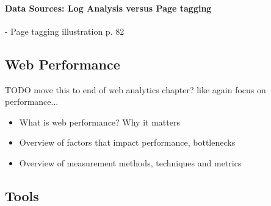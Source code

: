 



\paragraph{Data Sources: Log Analysis versus Page tagging}


- Page tagging illustration p. 82





















\subsection{Web Performance}
TODO move this to end of web analytics chapter? like again focus on performance...
\begin{itemize}
\item What is web performance? Why it matters
\item Overview of factors that impact performance, bottlenecks
\item Overview of measurement methods, techniques and metrics
\end{itemize}







\subsection{Tools}

